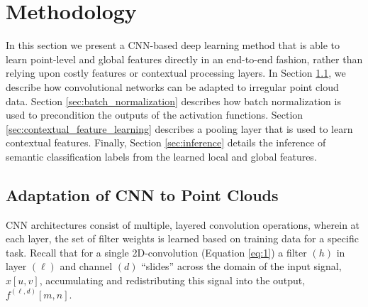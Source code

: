 \documentclass[final,3p,times,twocolumn,authoryear]{elsarticle}
\begin{document}
\section{Methodology}
\label{Methodology}
In this section we present a CNN-based deep learning method that is able to learn point-level and global features directly in an end-to-end fashion, rather than relying upon costly features or contextual processing layers. 
In Section \ref{sec:adaptation_of_cnn_to_point_clouds}, we describe how convolutional networks can be adapted to irregular point cloud data.
Section \ref{sec:batch_normalization} describes how batch normalization is used to precondition the outputs of the activation functions. 
Section \ref{sec:contextual_feature_learning} describes a pooling layer that is used to learn contextual features.
Finally, Section \ref{sec:inference} details the inference of semantic classification labels from the learned local and global features.
\subsection{Adaptation of CNN to Point Clouds}
\label{sec:adaptation_of_cnn_to_point_clouds}
CNN architectures consist of multiple, layered convolution operations, wherein at each layer, the set of filter weights is learned based on training data for a specific task. 
Recall that for a single 2D-convolution (Equation \ref{eq:1})  a filter $(h)$ in layer $(\ell)$ and channel $(d)$ ``slides'' across the domain of the input signal, $x[u,v]$, accumulating and redistributing this signal into the output, $f^{(\ell,d)}[m,n]$.
 
\end{document}
